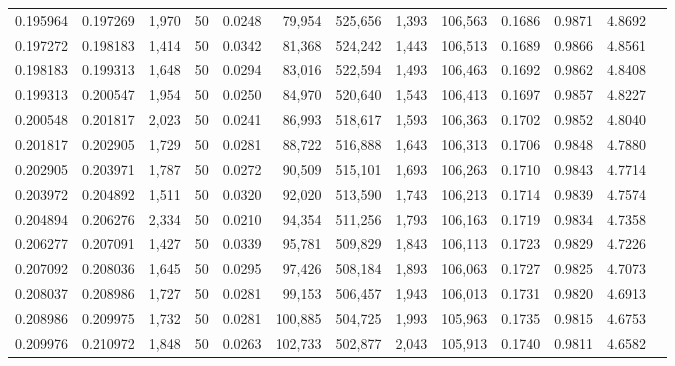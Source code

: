 \begin{tabular}{rrrrrrrrrrrrr}
0.195964 & 0.197269 & 1,970 &  50 &                                     0.0248 &  79,954 & 525,656 &   1,393 & 106,563 & 0.1686 & 0.9871 & 4.8692 \\
0.197272 & 0.198183 & 1,414 &  50 &                                     0.0342 &  81,368 & 524,242 &   1,443 & 106,513 & 0.1689 & 0.9866 & 4.8561 \\
0.198183 & 0.199313 & 1,648 &  50 &                                     0.0294 &  83,016 & 522,594 &   1,493 & 106,463 & 0.1692 & 0.9862 & 4.8408 \\
0.199313 & 0.200547 & 1,954 &  50 &                                     0.0250 &  84,970 & 520,640 &   1,543 & 106,413 & 0.1697 & 0.9857 & 4.8227 \\
0.200548 & 0.201817 & 2,023 &  50 &                                     0.0241 &  86,993 & 518,617 &   1,593 & 106,363 & 0.1702 & 0.9852 & 4.8040 \\
0.201817 & 0.202905 & 1,729 &  50 &                                     0.0281 &  88,722 & 516,888 &   1,643 & 106,313 & 0.1706 & 0.9848 & 4.7880 \\
0.202905 & 0.203971 & 1,787 &  50 &                                     0.0272 &  90,509 & 515,101 &   1,693 & 106,263 & 0.1710 & 0.9843 & 4.7714 \\
0.203972 & 0.204892 & 1,511 &  50 &                                     0.0320 &  92,020 & 513,590 &   1,743 & 106,213 & 0.1714 & 0.9839 & 4.7574 \\
0.204894 & 0.206276 & 2,334 &  50 &                                     0.0210 &  94,354 & 511,256 &   1,793 & 106,163 & 0.1719 & 0.9834 & 4.7358 \\
0.206277 & 0.207091 & 1,427 &  50 &                                     0.0339 &  95,781 & 509,829 &   1,843 & 106,113 & 0.1723 & 0.9829 & 4.7226 \\
0.207092 & 0.208036 & 1,645 &  50 &                                     0.0295 &  97,426 & 508,184 &   1,893 & 106,063 & 0.1727 & 0.9825 & 4.7073 \\
0.208037 & 0.208986 & 1,727 &  50 &                                     0.0281 &  99,153 & 506,457 &   1,943 & 106,013 & 0.1731 & 0.9820 & 4.6913 \\
0.208986 & 0.209975 & 1,732 &  50 &                                     0.0281 & 100,885 & 504,725 &   1,993 & 105,963 & 0.1735 & 0.9815 & 4.6753 \\
0.209976 & 0.210972 & 1,848 &  50 &                                     0.0263 & 102,733 & 502,877 &   2,043 & 105,913 & 0.1740 & 0.9811 & 4.6582 \\

\end{tabular}
